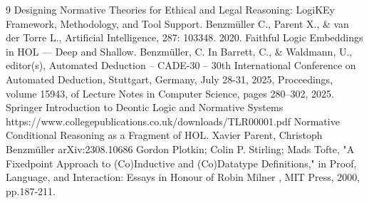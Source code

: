 \documentclass[sigconf,11pt]{acmart}
\begin{document}
\begin{thebibliography}{9}
 Designing Normative Theories for Ethical and Legal Reasoning: LogiKEy Framework, Methodology, and Tool Support. Benzmüller C., Parent X., \& van der Torre L., Artificial Intelligence, 287: 103348. 2020.
 Faithful Logic Embeddings in HOL — Deep and Shallow. Benzmüller, C. In Barrett, C., \& Waldmann, U., editor(s), Automated Deduction – CADE-30 – 30th International Conference on Automated Deduction, Stuttgart, Germany, July 28-31, 2025, Proceedings, volume 15943, of Lecture Notes in Computer Science, pages 280–302, 2025. Springer
 Introduction to Deontic Logic and Normative Systems https://www.collegepublications.co.uk/downloads/TLR00001.pdf
 Normative Conditional Reasoning as a Fragment of HOL. Xavier Parent, Christoph Benzmüller arXiv:2308.10686
 Gordon Plotkin; Colin P. Stirling; Mads Tofte, "A Fixedpoint Approach to (Co)Inductive and (Co)Datatype Definitions," in Proof, Language, and Interaction: Essays in Honour of Robin Milner , MIT Press, 2000, pp.187-211.
\end{thebibliography}
\end{document}
